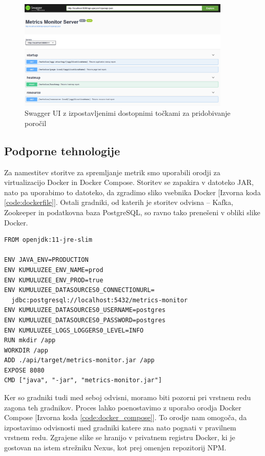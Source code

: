 \documentclass[a4paper, 12pt]{book}
\begin{document}
\begin{figure}[!htb]
	\begin{center}
		\includegraphics[width=0.9\textwidth]{swagger.png}
	\end{center}
	\caption{Swagger UI z izpostavljenimi dostopnimi točkami za pridobivanje poročil}
	\label{img:swagger}
\end{figure}

\subsection{Podporne tehnologije}
\label{ch3:sec2:sub3}

Za namestitev storitve za spremljanje metrik smo uporabili orodji za virtualizacijo Docker in Docker Compose. Storitev se zapakira v datoteko JAR, nato pa uporabimo to datoteko, da zgradimo sliko vsebnika Docker [Izvorna koda \ref{code:dockerfile}]. Ostali gradniki, od katerih je storitev odvisna -- Kafka, Zookeeper in podatkovna baza PostgreSQL, so ravno tako prenešeni v obliki slike Docker.

\begin{lstlisting}[label=code:dockerfile, caption=Dockerfile za storitev, float=h]
FROM openjdk:11-jre-slim

ENV JAVA_ENV=PRODUCTION
ENV KUMULUZEE_ENV_NAME=prod
ENV KUMULUZEE_ENV_PROD=true
ENV KUMULUZEE_DATASOURCES0_CONNECTIONURL=
  jdbc:postgresql://localhost:5432/metrics-monitor
ENV KUMULUZEE_DATASOURCES0_USERNAME=postgres
ENV KUMULUZEE_DATASOURCES0_PASSWORD=postgres
ENV KUMULUZEE_LOGS_LOGGERS0_LEVEL=INFO
RUN mkdir /app
WORKDIR /app
ADD ./api/target/metrics-monitor.jar /app
EXPOSE 8080
CMD ["java", "-jar", "metrics-monitor.jar"]
\end{lstlisting} 

Ker so gradniki tudi med seboj odvisni, moramo biti pozorni pri vrstnem redu zagona teh gradnikov. Proces lahko poenostavimo z uporabo orodja Docker Compose [Izvorna koda \ref{code:docker_compose}]. To orodje nam omogoča, da izpostavimo odvisnosti med gradniki katere zna nato pognati v pravilnem vrstnem redu. Zgrajene slike se hranijo v privatnem registru Docker, ki je gostovan na istem strežniku Nexus, kot prej omenjen repozitorij NPM.
\end{document}
